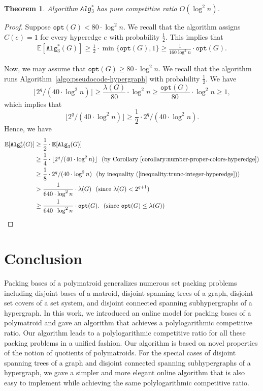 \documentclass[11pt]{article}
\newtheorem{theorem}{Theorem}
\theoremstyle{definition}
\newcommand{\opt}{\texttt{opt}}
\begin{document}
\begin{theorem}
    Algorithm \texttt{Alg$_3^*$} has pure competitive ratio $O(\log^2 n)$.
\end{theorem}
\begin{proof}
    Suppose $\opt(G)< 80\cdot \log^2 n$. We recall that the algorithm assigns $C(e)=1$ for every hyperedge $e$ with probability $\frac{1}{2}$. This implies that
    $$\begin{aligned}
        \mathbb{E}[\texttt{Alg$_3^*$}(G)] \geq \frac{1}{2}\cdot \min\{\opt(G),1\} \geq \frac{1}{160\log^2 n}\cdot \opt(G).
    \end{aligned}$$
    
    Now, we may assume that $\opt(G)\geq 80\cdot \log^2 n$. We recall that the algorithm runs Algorithm~\ref{algo:pseudocode-hypergraph} with probability $\frac{1}{2}$. We have
    $$\lfloor 2^q/(40\cdot \log ^2n) \rfloor\geq \frac{\lambda(G)}{80}\cdot \log^2 n\geq \frac{\opt(G)}{80}\cdot \log^2 n\geq 1,$$ which implies that
    \begin{equation}\label{inequality:trunc-integer-hyperedge}
        \lfloor 2^q/(40\cdot \log ^2n) \rfloor \geq \frac{1}{2}\cdot 2^q/(40\cdot \log ^2n).
    \end{equation}
    Hence, we have
    $$\begin{aligned}
        \mathbb{E}[\texttt{Alg$_3^*$}(G)]&\geq \frac{1}{2}\cdot \mathbb{E}[\texttt{Alg}_3(G)] \\
        &\geq \frac{1}{4}\cdot \lfloor 2^q/(40\cdot \log ^2n)\rfloor \ \ \text{(by Corollary~\ref{corollary:number-proper-colors-hyperedge})}\\
        &\geq \frac{1}{8}\cdot 2^q/(40\cdot \log ^2n) \ \ \text{(by inequality~(\ref{inequality:trunc-integer-hyperedge}))} \\
        &> \frac{1}{640\cdot \log^2n}\cdot \lambda(G) \ \ \text{(since $\lambda(G)<2^{q+1}$)}\\
        &\geq \frac{1}{640\cdot \log^2n}\cdot \opt(G). \ \ \text{(since $\opt(G)\leq \lambda(G)$)}
    \end{aligned}$$
\end{proof}


 \section{Conclusion}
Packing bases of a polymatroid generalizes numerous set packing problems including disjoint bases of a matroid, disjoint spanning trees of a graph, disjoint set covers of a set system, and disjoint connected spanning subhypergraphs of a hypergraph. In this work, we introduced an online model for packing bases of a polymatroid and gave an algorithm that achieves a polylogarithmic competitive ratio. Our algorithm leads to a polylogarithmic competitive ratio for all these packing problems in a unified fashion. Our algorithm is based on novel properties of the notion of quotients of polymatroids. For the special cases of disjoint spanning trees of a graph and disjoint connected spanning subhypergraphs of a hypergraph, we gave a simpler and more elegant online algorithm that is also easy to implement while achieving the same polylogarithmic competitive ratio. 
\end{document}
